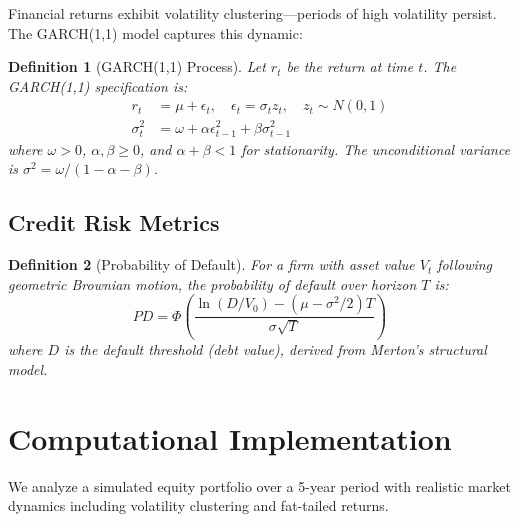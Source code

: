 \documentclass[11pt,a4paper]{article}
\newtheorem{definition}{Definition}[section]
\begin{document}
Financial returns exhibit volatility clustering—periods of high volatility persist. The GARCH(1,1) model captures this dynamic:

\begin{definition}[GARCH(1,1) Process]
Let $r_t$ be the return at time $t$. The GARCH(1,1) specification is:
\begin{align}
r_t &= \mu + \epsilon_t, \quad \epsilon_t = \sigma_t z_t, \quad z_t \sim N(0,1)\\
\sigma_t^2 &= \omega + \alpha \epsilon_{t-1}^2 + \beta \sigma_{t-1}^2
\end{align}
where $\omega > 0$, $\alpha, \beta \geq 0$, and $\alpha + \beta < 1$ for stationarity. The unconditional variance is $\sigma^2 = \omega/(1-\alpha-\beta)$.
\end{definition}

\subsection{Credit Risk Metrics}

\begin{definition}[Probability of Default]
For a firm with asset value $V_t$ following geometric Brownian motion, the probability of default over horizon $T$ is:
\begin{equation}
PD = \Phi\left(\frac{\ln(D/V_0) - (\mu - \sigma^2/2)T}{\sigma\sqrt{T}}\right)
\end{equation}
where $D$ is the default threshold (debt value), derived from Merton's structural model.
\end{definition}

\section{Computational Implementation}

We analyze a simulated equity portfolio over a 5-year period with realistic market dynamics including volatility clustering and fat-tailed returns.
\end{document}

